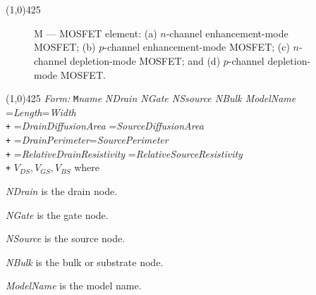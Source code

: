 \oddsidemargin 10mm \topmargin 0.0in \textwidth 5.5in \textheight
7.375in \evensidemargin 1.0in \headheight 0.18in \footskip 0.16in
%
\section[M \- MOSFET]{}
\linethickness{1mm}
\line(1,0){425}
\normalsize
\begin{figure}[h]
\centering \epsfxsize=4in \caption[M --- MOSFET
element]{M --- MOSFET element: (a) $n$-channel enhancement-mode
MOSFET; (b) $p$-channel enhancement-mode MOSFET; (c) $n$-channel
depletion-mode MOSFET; and (d) $p$-channel depletion-mode MOSFET.
\label{m.ps}}
\end{figure}
\linethickness{0.5mm} \line(1,0){425}
\newline
\textit{Form:}
\newline
{\tt M}{\it name} {\it NDrain NGate NSsource NBulk ModelName}
              ={\it Length}\E  {}={\it Width}\E  \\
      {\tt +} ={\it DrainDiffusionArea}\E
              ={\it SourceDiffusionArea}\E  \\
      {\tt +} ={\it DrainPerimeter}\E  {}={\it SourcePerimeter}\E \\
      {\tt +} ={\it RelativeDrainResistivity}\E
              ={\it RelativeSourceResistivity}\E \\
      {\tt +} \E  {}$V_{DS},V_{GS},V_{BS}$\E
\newline
where\\
\begin{widelist}
\item[{\it NDrain}] is the drain node.
\item[{\it NGate}] is the gate node.
\item[{\it NSource}] is the source node.
\item[{\it NBulk}] is the bulk or substrate node.
\item[{\it ModelName}]  is  the  model name.
\end{widelist}

